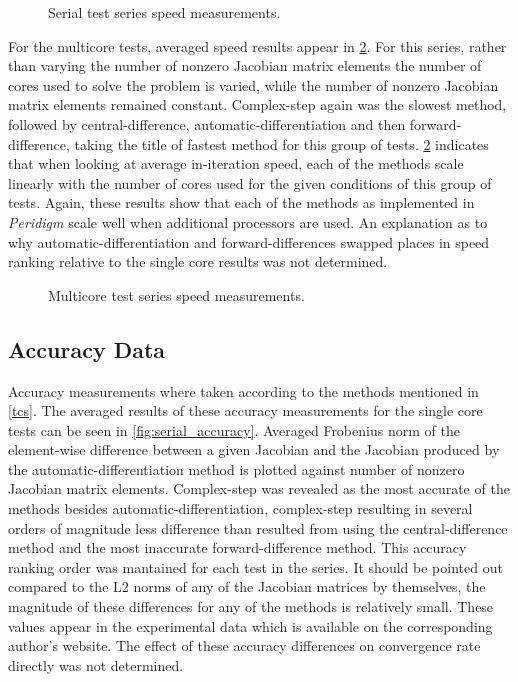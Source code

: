 \documentclass[preprint,12pt]{elsarticle}
\begin{document}
\begin{figure}[h]
  \centering
  \scalebox{1.0}{}
  \caption{Serial test series speed measurements.}
  \label{fig:serial_speed}
\end{figure}

For the multicore tests, averaged speed results appear in \ref{fig:multi_speed}. For this series,
rather than varying the number of nonzero Jacobian matrix elements the number of cores used to
solve the problem is varied, while the number of nonzero Jacobian matrix elements remained constant.
Complex-step again was the slowest method, followed by central-difference, automatic-differentiation
and then forward-difference, taking the title of fastest method for this group of tests.
\ref{fig:multi_speed} indicates that when looking at average in-iteration speed, each of the
methods scale linearly with the number of cores used for the given conditions of this group of
tests. Again, these results show that each of the methods as implemented in \emph{Peridigm} scale
well when additional processors are used. An explanation as to why automatic-differentiation and
forward-differences swapped places in speed ranking relative to the single core results was not
determined. 

\begin{figure}[h]
  \centering
  \scalebox{1.0}{}
  \caption{Multicore test series speed measurements.}
  \label{fig:multi_speed}
\end{figure}

\subsection{Accuracy Data}
Accuracy measurements where taken according to the methods mentioned in \ref{tcs}. The averaged
results of these accuracy measurements for the single core tests can be seen in
\ref{fig:serial_accuracy}. Averaged Frobenius norm of the element-wise difference between a given
Jacobian and the Jacobian produced by the automatic-differentiation method is plotted against number
of nonzero Jacobian matrix elements. Complex-step was revealed as the most accurate of the methods
besides automatic-differentiation, complex-step resulting in several orders of magnitude less
difference than resulted from using the central-difference method and the most inaccurate
forward-difference method. This accuracy ranking order was mantained for each test in the series. It
should be pointed out compared to the L2 norms of any of the Jacobian matrices by themselves, the
magnitude of these differences for any of the methods is relatively small. These values appear in
the experimental data which is available on the corresponding author's website. The effect of these
accuracy differences on convergence rate directly was not determined.
\end{document}

